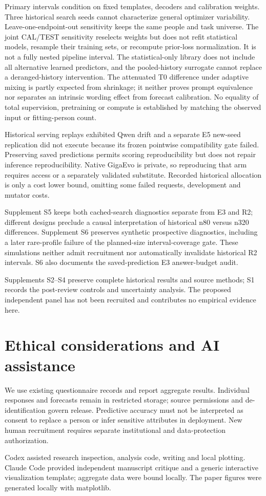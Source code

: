 \documentclass[11pt]{article}
\begin{document}
Primary intervals condition on fixed templates, decoders and calibration weights. Three historical search seeds cannot characterize general optimizer variability. Leave-one-endpoint-out sensitivity keeps the same people and task universe. The joint CAL/TEST sensitivity reselects weights but does not refit statistical models, resample their training sets, or recompute prior-loss normalization. It is not a fully nested pipeline interval. The statistical-only library does not include all alternative learned predictors, and the pooled-history surrogate cannot replace a deranged-history intervention. The attenuated T0 difference under adaptive mixing is partly expected from shrinkage; it neither proves prompt equivalence nor separates an intrinsic wording effect from forecast calibration. No equality of total supervision, pretraining or compute is established by matching the observed input or fitting-person count.

Historical serving replays exhibited Qwen drift and a separate E5 new-seed replication did not execute because its frozen pointwise compatibility gate failed. Preserving saved predictions permits scoring reproducibility but does not repair inference reproducibility. Native GigaEvo is private, so reproducing that arm requires access or a separately validated substitute. Recorded historical allocation is only a cost lower bound, omitting some failed requests, development and mutator costs.

Supplement S5 keeps both cached-search diagnostics separate from E3 and R2; different designs preclude a causal interpretation of historical n80 versus n320 differences. Supplement S6 preserves synthetic prospective diagnostics, including a later rare-profile failure of the planned-size interval-coverage gate. These simulations neither admit recruitment nor automatically invalidate historical R2 intervals. S6 also documents the saved-prediction E3 answer-budget audit.

Supplements S2--S4 preserve complete historical results and source methods; S1 records the post-review controls and uncertainty analysis. The proposed independent panel has not been recruited and contributes no empirical evidence here.

\section*{Ethical considerations and AI assistance}
We use existing questionnaire records and report aggregate results. Individual responses and forecasts remain in restricted storage; source permissions and de-identification govern release. Predictive accuracy must not be interpreted as consent to replace a person or infer sensitive attributes in deployment. New human recruitment requires separate institutional and data-protection authorization.

Codex assisted research inspection, analysis code, writing and local plotting. Claude Code provided independent manuscript critique and a generic interactive visualization template; aggregate data were bound locally. The paper figures were generated locally with matplotlib.


\end{document}

